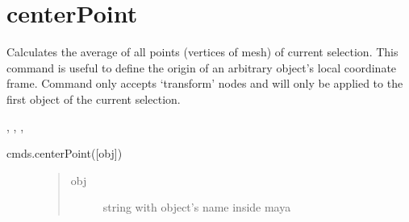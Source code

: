 \documentclass[letterpaper,10pt,english]{sphinxmanual}
\begin{document}
\section{centerPoint}
\label{\detokenize{pk_src.centerPoint:centerpoint}}\label{\detokenize{pk_src.centerPoint::doc}}\label{\detokenize{pk_src.centerPoint:id1}}
{\hyperref[\detokenize{index:commands}]{}}
\label{\detokenize{pk_src.centerPoint:module-pk_src.centerPoint}}
Calculates the average of all points (vertices of mesh) of current selection. This command is useful to define the origin of an arbitrary object’s local coordinate frame.
Command only accepts ‘transform’ nodes and will only be applied to the first object of the current selection.

 {\hyperref[\detokenize{pk_src.centroidPoint:centroidpoint}]{}}, {\hyperref[\detokenize{pk_src.axisParallelPlane:axisparallelplane}]{}}, {\hyperref[\detokenize{pk_src.normalize:normalize}]{}}, {\hyperref[\detokenize{pk_src.exportData:exportdata}]{}}

 cmds.centerPoint({[}obj{]})
\begin{description}
\item[{}] \leavevmode\begin{quote}\begin{description}
\item[{obj}] \leavevmode
string with object’s name inside maya

\end{description}\end{quote}

\item[{}] \leavevmode
\begin{sphinxVerbatim}[commandchars=\\\{\}]
\end{sphinxVerbatim}

\end{description}
\end{document}
